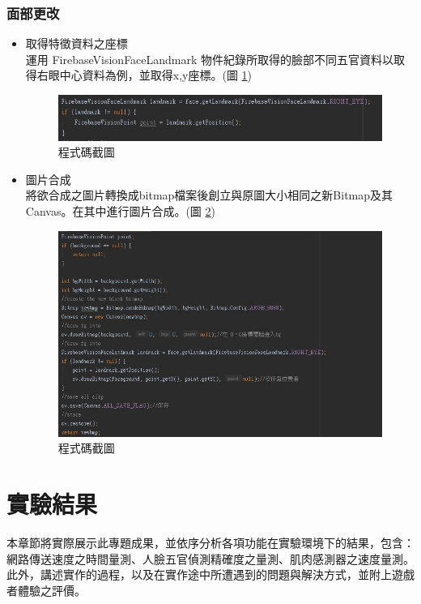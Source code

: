 \documentclass[12pt]{article}  %
\theoremstyle{plain}
\begin{document}
\subsubsection{面部更改}
\begin{itemize}
\item 取得特徵資料之座標 \\
運用 FirebaseVisionFaceLandmark 物件紀錄所取得的臉部不同五官資料以取得右眼中心資料為例，並取得x,y座標。(圖 \ref{Landmark})
\begin{figure}[htbp]
\centering
\includegraphics[width=15cm]{pic/ch3/Landmark.jpg}
\caption{程式碼截圖} \label{Landmark}
\end{figure}

\item 圖片合成 \\
將欲合成之圖片轉換成bitmap檔案後創立與原圖大小相同之新Bitmap及其Canvas。在其中進行圖片合成。(圖 \ref{imgcon})
\begin{figure}[htbp]
\centering
\includegraphics[width=13cm]{pic/ch3/imgcon.jpg}
\caption{程式碼截圖} \label{imgcon}
\end{figure}
\end{itemize}
\newpage


\section{實驗結果}
本章節將實際展示此專題成果，並依序分析各項功能在實驗環境下的結果，包含：網路傳送速度之時間量測、人臉五官偵測精確度之量測、肌肉感測器之速度量測。此外，講述實作的過程，以及在實作途中所遭遇到的問題與解決方式，並附上遊戲者體驗之評價。
\end{document}
